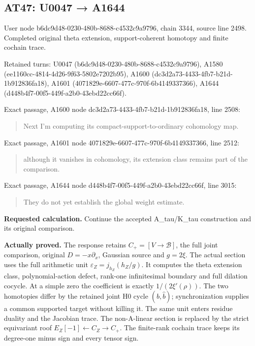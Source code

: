 \subsection{AT47: U0047 → A1644}\label{at47-u0047-a1644}

User node b6dc9d48-0230-480b-8688-c4532c9a9796, chain 3344, source line
2498. Completed original theta extension, support-coherent homotopy and
finite cochain trace.

Retained turns: U0047 (b6dc9d48-0230-480b-8688-c4532c9a9796), A1580
(ee1160cc-4814-4d26-9f63-5802e7202b95), A1600
(dc3d2a73-4433-4fb7-b21d-1b912836fa18), A1601
(4071829e-6607-477c-970f-6b4149337366), A1644
(d448b4f7-00f5-449f-a2b0-43ebd22cc66f).

Exact passage, A1600 node dc3d2a73-4433-4fb7-b21d-1b912836fa18, line
2508:

\begin{quote}
Next I'm computing its compact-support-to-ordinary cohomology map.
\end{quote}

Exact passage, A1601 node 4071829e-6607-477c-970f-6b4149337366, line
2512:

\begin{quote}
although it vanishes in cohomology, its extension class remains part of
the comparison.
\end{quote}

Exact passage, A1644 node d448b4f7-00f5-449f-a2b0-43ebd22cc66f, line
3015:

\begin{quote}
They do not yet establish the global weight estimate.
\end{quote}

\textbf{Requested calculation.} Continue the accepted A\_tau/K\_tau
construction and its original comparison.

\textbf{Actually proved.} The response retains \(C_+=[V\to\mathscr B]\),
the full joint comparison, original \(D=-x\partial_x\), Gaussian source
and \(g=2\xi\). The actual section uses the full arithmetic unit
\(\varepsilon_Z=j_{h_Z}(h_Z/g)\). It computes the theta extension class,
polynomial-action defect, rank-one infinitesimal boundary and full
dilation cocycle. At a simple zero the coefficient is exactly
\(1/(2\xi'(\rho))\). The two homotopies differ by the retained joint H0
cycle \((b,\widehat b)\); synchronization supplies a common supported
target without killing it. The same unit enters residue duality and the
Jacobian trace. The non-A-linear section is replaced by the strict
equivariant roof \(E_Z[-1]\leftarrow C_Z\to C_+\). The finite-rank
cochain trace keeps its degree-one minus sign and every tensor sign.

